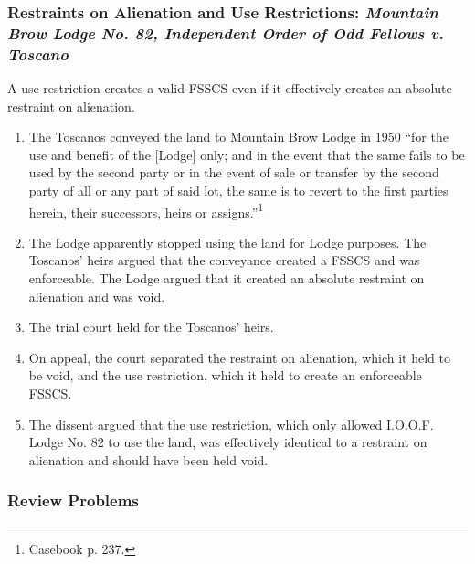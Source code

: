 \subsubsection{Restraints on Alienation and Use Restrictions: \emph{Mountain 
Brow Lodge No. 82, Independent Order of Odd Fellows v. Toscano}}

A use restriction creates a valid FSSCS even if it effectively creates an 
absolute restraint on alienation.

\begin{enumerate}
    \item The Toscanos conveyed the land to Mountain Brow Lodge in 1950 ``for 
    the use and benefit of the [Lodge] only; and in the event that the same 
    fails to be used by the second party or in the event of sale or transfer 
    by the second party of all or any part of said lot, the same is to revert 
    to the first parties herein, their successors, heirs or 
    assigns.''\footnote{Casebook p. 237.}
    \item The Lodge apparently stopped using the land for Lodge purposes. The 
    Toscanos' heirs argued that the conveyance created a FSSCS and was 
    enforceable. The Lodge argued that it created an absolute restraint on 
    alienation and was void.
    \item The trial court held for the Toscanos' heirs.
    \item On appeal, the court separated the restraint on alienation, which it 
    held to be void, and the use restriction, which it held to create an 
    enforceable FSSCS.
    \item The dissent argued that the use restriction, which only allowed 
    I.O.O.F. Lodge No. 82 to use the land, was effectively identical to a 
    restraint on alienation and should have been held void.
\end{enumerate}

\subsubsection{Review Problems}

